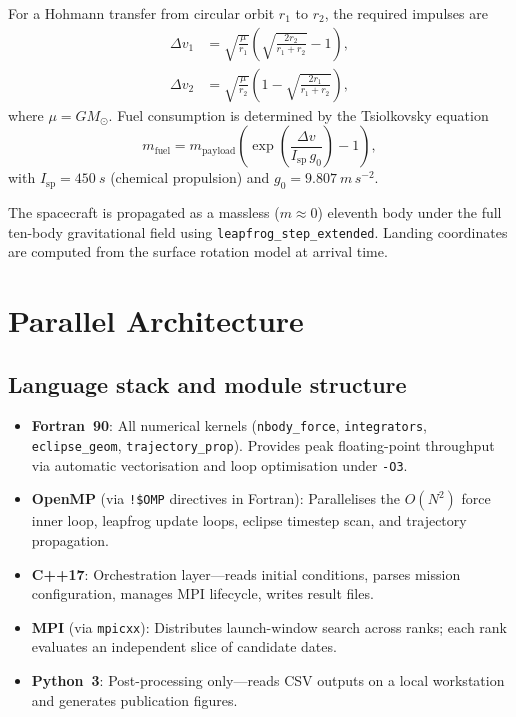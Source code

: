 \documentclass[conference]{IEEEtran}
\begin{document}
For a Hohmann transfer from circular orbit $r_1$ to $r_2$,
the required impulses are
\begin{align}
  \Delta v_1 &= \sqrt{\frac{\mu}{r_1}}\!
    \left(\sqrt{\frac{2r_2}{r_1+r_2}}-1\right), \\
  \Delta v_2 &= \sqrt{\frac{\mu}{r_2}}\!
    \left(1-\sqrt{\frac{2r_1}{r_1+r_2}}\right),
\end{align}
where $\mu = G M_\odot$.  Fuel consumption is determined
by the Tsiolkovsky equation
\begin{equation}
  m_{\mathrm{fuel}} = m_{\mathrm{payload}}
    \left(\exp\!\left(\frac{\Delta v}{I_{\mathrm{sp}}\,g_0}\right)-1\right),
  \label{eq:tsiolkovsky}
\end{equation}
with $I_{\mathrm{sp}}=\SI{450}{s}$ (chemical propulsion)
and $g_0 = \SI{9.807}{m\,s^{-2}}$.

The spacecraft is propagated as a massless ($m\approx 0$)
eleventh body under the full ten-body gravitational field
using \texttt{leapfrog\_step\_extended}.  Landing
coordinates are computed from the surface rotation model
at arrival time.

\section{Parallel Architecture}
\label{sec:parallel}

\subsection{Language stack and module structure}

\begin{itemize}
  \item \textbf{Fortran~90}: All numerical kernels
    (\texttt{nbody\_force}, \texttt{integrators},
    \texttt{eclipse\_geom}, \texttt{trajectory\_prop}).
    Provides peak floating-point throughput via
    automatic vectorisation and loop optimisation under
    \texttt{-O3}.
  \item \textbf{OpenMP} (via \texttt{!\$OMP} directives in
    Fortran): Parallelises the $O(N^2)$ force inner loop,
    leapfrog update loops, eclipse timestep scan, and
    trajectory propagation.
  \item \textbf{C++17}: Orchestration layer---reads initial
    conditions, parses mission configuration, manages
    MPI lifecycle, writes result files.
  \item \textbf{MPI} (via \texttt{mpicxx}): Distributes
    launch-window search across ranks; each rank evaluates
    an independent slice of candidate dates.
  \item \textbf{Python~3}: Post-processing only---reads
    CSV outputs on a local workstation and generates
    publication figures.
\end{itemize}
\end{document}
